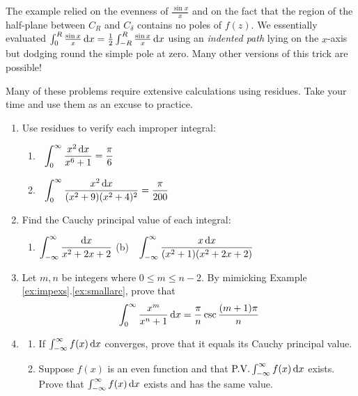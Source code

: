 The example relied on the evenness of $\frac{\sin x}x$ and on the fact that the region of the half-plane between $C_R$ and $C_\delta$ contains no poles of $f(z)$. We essentially evaluated $\int_0^R\frac{\sin x}x\,{\mathrm{d} x}=\frac 12\int_{-R}^R\frac{\sin x}x\,{\mathrm{d} x}$ using an \emph{indented path} lying on the $x$-axis but dodging round the simple pole at zero. Many other versions of this trick are possible!


\goodbreak


\begin{exercises}
	\hangindent\leftmargini
	Many of these problems require extensive calculations using residues. Take your time and use them as an excuse to practice.	
	\begin{enumerate}
	  \item Use residues to verify each improper integral:
	  \begin{enumerate}
	    \item {}\ 
	    $\displaystyle\int_0^\infty\frac{x^2\,{\mathrm{d} x}}{x^6+1}=\frac\pi 6$
	    \setcounter{enumii}{2}
	    \item {}\
	    $\displaystyle\int_0^\infty\frac{x^2\,{\mathrm{d} x}}{(x^2+9)(x^2+4)^2}=\frac\pi{200}$
	  \end{enumerate}
	  
	  
	  \item Find the Cauchy principal value of each integral:
	  \begin{enumerate}
	    \item $\displaystyle\int_{-\infty}^\infty\frac{{\mathrm{d} x}}{x^2+2x+2}$
	    \qquad\qquad
	    (b)\ \ $\displaystyle\int_{-\infty}^\infty\frac{x\,{\mathrm{d} x}}{(x^2+1)(x^2+2x+2)}$
	  \end{enumerate}
	  
	  
	  \item Let $m,n$ be integers where $0\le m\le n-2$. By mimicking Example \ref*{ex:impexs}.\ref{ex:smallarc}, prove that
	  \[
	  	\int_0^\infty\frac{x^m}{x^n+1}\,{\mathrm{d} x}=\frac\pi n\csc\frac{(m+1)\pi}n
	  \]  
	 
	  
	  \item\begin{enumerate}
	    \item If $\int_{-\infty}^\infty f(x)\,{\mathrm{d} x}$ converges, prove that it equals its Cauchy principal value.
	    
	    \item Suppose $f(x)$ is an even function and that $\text{P.V.}\int_{-\infty}^\infty f(x)\,{\mathrm{d} x}$ exists. Prove that $\int_{-\infty}^\infty f(x)\,{\mathrm{d} x}$ exists and has the same value.
	  \end{enumerate}
	  

\end{enumerate}
\end{exercises}
